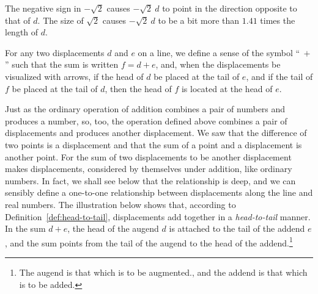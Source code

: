 \begin{center}
\end{center}

\noindent The negative sign in $-\sqrt{2}$ causes $-\sqrt{2} \: d$ to point in
the direction opposite to that of $d$. The size of $\sqrt{2}$ causes $-\sqrt{2}
\: d$ to be a bit more than $1.41$ times the length of $d$.

\begin{definition}
   For any two displacements $d$ and $e$ on a line, we define a sense of the
   symbol ``$\:+$'' such that the sum is written $f = d + e$, and, when the
   displacements be visualized with arrows, if the head of $d$ be placed at the
   tail of $e$, and if the tail of $f$ be placed at the tail of $d$, then the
   head of $f$ is located at the head of $e$.
\label{def:head-to-tail}
\end{definition}

\noindent Just as the ordinary operation of addition combines a pair of numbers
and produces a number, so, too, the operation defined above combines a pair of
displacements and produces another displacement. We saw that the difference of
two points is a displacement and that the sum of a point and a displacement is
another point. For the sum of two displacements to be another displacement
makes displacements, considered by themselves under addition, like ordinary
numbers. In fact, we shall see below that the relationship is deep, and we can
sensibly define a one-to-one relationship between displacements along the line
and real numbers.  The illustration below shows that, according to
Definition~\ref{def:head-to-tail}, displacements add together in a
\emph{head-to-tail} manner. In the sum $d + e$, the head of the augend $d$ is
attached to the tail of the addend $e$, and the sum points from the tail of the
augend to the head of the addend.\footnote{%
   The augend is that which is to be augmented., and the addend is that which
   is to be added.%
}

